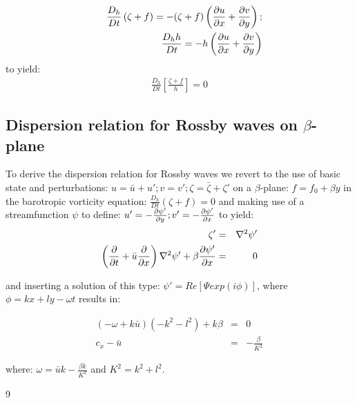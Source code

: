 \begin{eqnarray}
	&&\frac{D_h}{Dt}\left({\zeta+f}\right) = -(\zeta+f) \left( \frac{\partial u}{\partial x} + \frac{\partial v}{\partial y} \right);\\
	&&\frac{D_h h}{D t} = -h \left( \frac{\partial u}{\partial x} + \frac{\partial v}{\partial y} \right)
\end{eqnarray}
to yield:
\begin{eqnarray}
	\frac{D_h}{Dt}\left[\frac {\zeta+f}{h} \right]=0
	\label{PVcons}
\end{eqnarray} 

\subsection{Dispersion relation for Rossby waves on $\beta$-plane}

To derive the dispersion relation for Rossby waves we revert to the use of basic state and perturbations: $u=\bar{u}+u'; v=v'; \zeta = \bar{\zeta}+\zeta'$ on a $\beta$-plane: $f=f_0+\beta y$ in the barotropic vorticity equation: $\frac{D_h}{Dt}\left({\zeta+f} \right)=0$
and making use of a streamfunction $\psi$ to define: $u'=-\frac{\partial \psi'}{\partial y}; v'=-\frac{\partial \psi'}{\partial x}$ to yield:
\begin{eqnarray}
	\zeta'&=&\nabla^2\psi'\\
	\left(\frac{\partial }{\partial t}+\bar{u}\frac{\partial }{\partial x}\right)\nabla^2\psi'+\beta \frac{\partial \psi'}{\partial x}&=&0
\end{eqnarray}

and inserting a solution of this type: $\psi'=Re[\Psi exp(i\phi)]$, where $\phi=kx+ly-\omega t$ results in:

\begin{eqnarray}
	(-\omega + k\bar{u})(-k^2-l^2)+k \beta & = & 0\\
	c_x-\bar{u} & = & -\frac{\beta}{K^2}
\end{eqnarray}

where: $\omega=\bar{u}k-\frac{\beta k}{K^2}$ and $K^2=k^2+l^2$.\\


\vspace{1em} 



\begin{thebibliography}{9}
	
	\printbibliography[%
	heading=bibempty
	]
	
\end{thebibliography}

